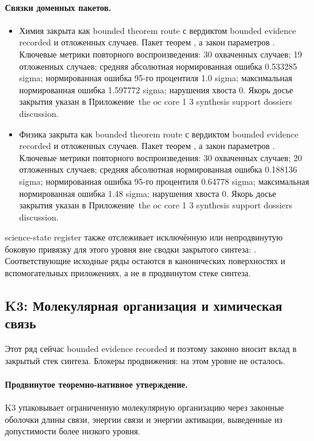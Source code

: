 \paragraph{Связки доменных пакетов.}
\begin{itemize}[leftmargin=1.6em,nosep]
\item Химия закрыта как bounded theorem route с вердиктом bounded evidence recorded и  отложенных случаев. Пакет теорем , а закон параметров . Ключевые метрики повторного воспроизведения: 30 охваченных случаев; 19 отложенных случаев; средняя абсолютная нормированная ошибка 0.533285 sigma; нормированная ошибка 95-го процентиля 1.0 sigma; максимальная нормированная ошибка 1.597772 sigma; нарушения хвоста 0. Якорь досье закрытия указан в Приложение~the oc core 1 3 synthesis support dossiers discussion.
\item Физика закрыта как bounded theorem route с вердиктом bounded evidence recorded и  отложенных случаев. Пакет теорем , а закон параметров . Ключевые метрики повторного воспроизведения: 30 охваченных случаев; 20 отложенных случаев; средняя абсолютная нормированная ошибка 0.188136 sigma; нормированная ошибка 95-го процентиля 0.64778 sigma; максимальная нормированная ошибка 1.48 sigma; нарушения хвоста 0. Якорь досье закрытия указан в Приложение~the oc core 1 3 synthesis support dossiers discussion.
\end{itemize}
science-state register также отслеживает  исключённую или непродвинутую боковую привязку для этого уровня вне сводки закрытого синтеза: . Соответствующие исходные ряды остаются в канонических поверхностях и вспомогательных приложениях, а не в продвинутом стеке синтеза.

\subsection{K3: Молекулярная организация и химическая связь}
\label{sec:oc-core-1-3-synthesis-k3}
Этот ряд сейчас bounded evidence recorded и поэтому законно вносит вклад в закрытый стек синтеза.
Блокеры продвижения: на этом уровне не осталось.

\paragraph{Продвинутое теоремно-нативное утверждение.}
K3 упаковывает ограниченную молекулярную организацию через законные оболочки длины связи, энергии связи и энергии активации, выведенные из допустимости более низкого уровня.

